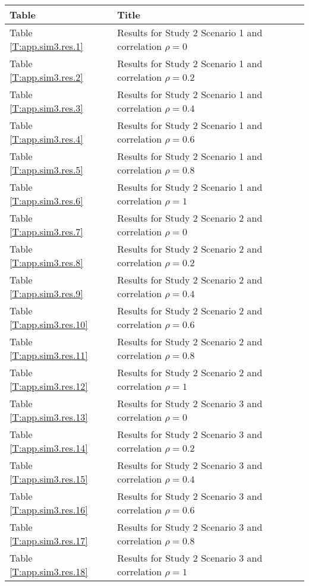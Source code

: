 \begin{tabular}{ll}
  \hline
\hline
Table & Title \\ 
  \hline
Table \ref{T:app.sim3.res.1} & Results for Study 2 Scenario 1 and correlation $\rho =0$ \\ 
  Table \ref{T:app.sim3.res.2} & Results for Study 2 Scenario 1 and correlation $\rho =0.2$ \\ 
  Table \ref{T:app.sim3.res.3} & Results for Study 2 Scenario 1 and correlation $\rho =0.4$ \\ 
  Table \ref{T:app.sim3.res.4} & Results for Study 2 Scenario 1 and correlation $\rho =0.6$ \\ 
  Table \ref{T:app.sim3.res.5} & Results for Study 2 Scenario 1 and correlation $\rho =0.8$ \\ 
  Table \ref{T:app.sim3.res.6} & Results for Study 2 Scenario 1 and correlation $\rho =1$ \\ 
   \hline
Table \ref{T:app.sim3.res.7} & Results for Study 2 Scenario 2 and correlation $\rho =0$ \\ 
  Table \ref{T:app.sim3.res.8} & Results for Study 2 Scenario 2 and correlation $\rho =0.2$ \\ 
  Table \ref{T:app.sim3.res.9} & Results for Study 2 Scenario 2 and correlation $\rho =0.4$ \\ 
  Table \ref{T:app.sim3.res.10} & Results for Study 2 Scenario 2 and correlation $\rho =0.6$ \\ 
  Table \ref{T:app.sim3.res.11} & Results for Study 2 Scenario 2 and correlation $\rho =0.8$ \\ 
  Table \ref{T:app.sim3.res.12} & Results for Study 2 Scenario 2 and correlation $\rho =1$ \\ 
   \hline
Table \ref{T:app.sim3.res.13} & Results for Study 2 Scenario 3 and correlation $\rho =0$ \\ 
  Table \ref{T:app.sim3.res.14} & Results for Study 2 Scenario 3 and correlation $\rho =0.2$ \\ 
  Table \ref{T:app.sim3.res.15} & Results for Study 2 Scenario 3 and correlation $\rho =0.4$ \\ 
  Table \ref{T:app.sim3.res.16} & Results for Study 2 Scenario 3 and correlation $\rho =0.6$ \\ 
  Table \ref{T:app.sim3.res.17} & Results for Study 2 Scenario 3 and correlation $\rho =0.8$ \\ 
  Table \ref{T:app.sim3.res.18} & Results for Study 2 Scenario 3 and correlation $\rho =1$ \\ 

\end{tabular}
